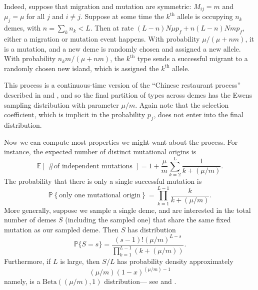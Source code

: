 \documentclass{article}
\renewcommand{\P}{\mathbb{P}}
\newcommand{\E}{\mathbb{E}}
\begin{document}
Indeed, suppose that migration and mutation are symmetric: $M_{ij}=m$ and $\mu_j = \mu$ for all $j$ and $i\neq j$.
Suppose at some time the $k^\mathrm{th}$ allele is occupying $n_k$ demes, 
with $n = \sum_k n_k < L$.
Then at rate $(L-n) N \mu p_f + n (L-n) N m p_f$,
either a migration or mutation event happens.
With probability $\mu/(\mu + n m)$, it is a mutation,
and a new deme is randomly chosen and assigned a new allele.
With probability $n_k m / (\mu + n m)$,
the $k^\mathrm{th}$ type sends a successful migrant to a randomly chosen new island,
which is assigned the $k^\mathrm{th}$ allele.

This process is a continuous-time version of the ``Chinese restaurant process''
described in \citet{aldous1985exchangeability} and \citet{pitman1995partitions},
and so the final partition of types across demes has the Ewens sampling distribution with parameter $\mu/m$.
Again note that the selection coefficient, which is implicit in the probability $p_f$,
does not enter into the final distribution.

Now we can compute most properties we might want about the process.
For instance, the expected number of distinct mutational origins is
\begin{equation}
    \E\left[ \mbox{ \# of independent mutations } \right] = 
            1 + \frac{\mu}{m} \sum_{k=2}^L \frac{1}{k+(\mu/m)}. \label{discrete_expected}
\end{equation}
The probability that there is only a single successful mutation is
\begin{equation}
\P \left\{ \mbox{only one mutational origin} \right\} = 
            \prod_{k=1}^{L-1} \frac{ k }{ k+(\mu/m)} .
\end{equation}
More generally, suppose we sample a single deme, and are interested in the total number of demes $S$
(including the sampled one) that share the same fixed mutation as our sampled deme.
Then $S$ has distribution
\begin{equation} \label{eqn:Sdistrn}
\P\{ S=s \} = \frac{ (s-1)! (\mu/m)^{L-s} }{ \prod_{k=1}^{L-1} (k+(\mu/m)) } .
\end{equation}
Furthermore, if $L$ is large, then $S/L$ has probability density approximately
\begin{equation} \label{eqn:betadistrn}
   (\mu/m) (1-x)^{(\mu/m)-1}
\end{equation}
namely, is a $\mathrm{Beta}((\mu/m), 1)$ distribution--- see \cite{donnelly-joyce} and \cite{permanPitmanYor92}.

\end{document}
